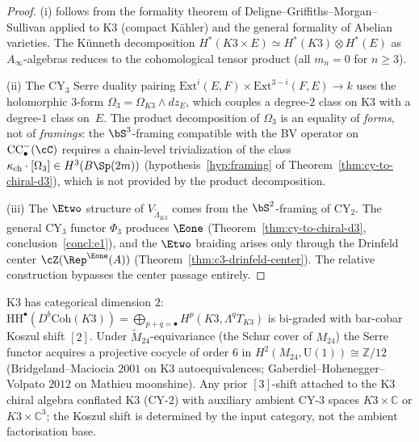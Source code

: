 \begin{proof}
(i) follows from the formality theorem of Deligne--Griffiths--Morgan--Sullivan
applied to K3 (compact K\"ahler) and the general formality of Abelian
varieties. The K\"unneth decomposition
$H^*(K3 \times E) \simeq H^*(K3) \otimes H^*(E)$ as $A_\infty$-algebras
reduces to the cohomological tensor product (all $m_n = 0$ for $n \geq 3$).

(ii) The CY$_3$ Serre duality pairing
$\mathrm{Ext}^i(E, F) \times \mathrm{Ext}^{3-i}(F, E) \to k$
uses the holomorphic $3$-form $\Omega_3 = \Omega_{K3} \wedge dz_E$,
which couples a degree-$2$ class on K3 with a degree-$1$ class on~$E$.
The product decomposition of $\Omega_3$ is an equality of
\emph{forms}, not of \emph{framings}: the $\bS^3$-framing compatible
with the BV operator on $\mathrm{CC}_\bullet^-(\cC)$ requires a
chain-level trivialization of the class
$\kappa_{\mathrm{ch}} \cdot [\Omega_3] \in H^3(B\Sp(2m))$
(hypothesis~\ref{hyp:framing} of Theorem~\ref{thm:cy-to-chiral-d3}),
which is not provided by the product decomposition.

(iii) The $\Etwo$ structure of $V_{\widetilde{\Lambda}_{K3}}$ comes
from the $\bS^2$-framing of CY$_2$. The general CY$_3$ functor
$\Phi_3$ produces $\Eone$ (Theorem~\ref{thm:cy-to-chiral-d3},
conclusion~\ref{concl:e1}), and the $\Etwo$ braiding arises only
through the Drinfeld center
$\cZ(\Rep^{\Eone}(A))$ (Theorem~\ref{thm:c3-drinfeld-center}).
The relative construction bypasses the center passage entirely.
\end{proof}

\begin{remark}
\label{rem:k3ca-cy2-shift-M24}
K3 has categorical dimension $2$: $\mathrm{HH}^\bullet(D^b\mathrm{Coh}(K3)) = \bigoplus_{p+q=\bullet} H^p(K3,\Lambda^q T_{K3})$ is bi-graded with bar-cobar Koszul shift $[2]$. Under $\widetilde{M}_{24}$-equivariance (the Schur cover of $M_{24}$) the Serre functor acquires a projective cocycle of order $6$ in $H^2(M_{24},\mathrm{U}(1))\cong\mathbb{Z}/12$ (Bridgeland--Maciocia $2001$ on K3 autoequivalences; Gaberdiel--Hohenegger--Volpato $2012$ on Mathieu moonshine). Any prior $[3]$-shift attached to the K3 chiral algebra conflated K3 (CY-$2$) with auxiliary ambient CY-$3$ spaces $K3\times\mathbb{C}$ or $K3\times\mathbb{C}^3$; the Koszul shift is determined by the input category, not the ambient factorisation base.
\end{remark}

